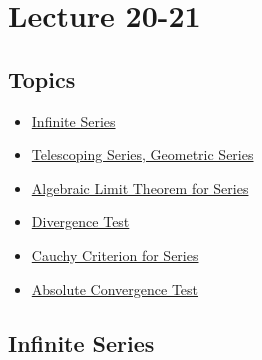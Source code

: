 \documentclass[a4paper]{article}
\begin{document}
\section{Lecture 20-21}
\subsection{Topics}

\begin{itemize}
    \item {\hyperref[Infinite Series]{Infinite Series}}
    \item {\hyperref[Telescoping Series, Geometric Series]{Telescoping Series, Geometric Series}}
    \item {\hyperref[Algebraic Limit Theorem for Series]{Algebraic Limit Theorem for Series}}
    \item {\hyperref[Divergence Test]{Divergence Test}}
    \item {\hyperref[Cauchy Criterion for Series]{Cauchy Criterion for Series}}
    \item {\hyperref[Absolute Convergence Test]{Absolute Convergence Test}}
\end{itemize}

\subsection{Infinite Series}\label{Infinite Series}
\end{document}
